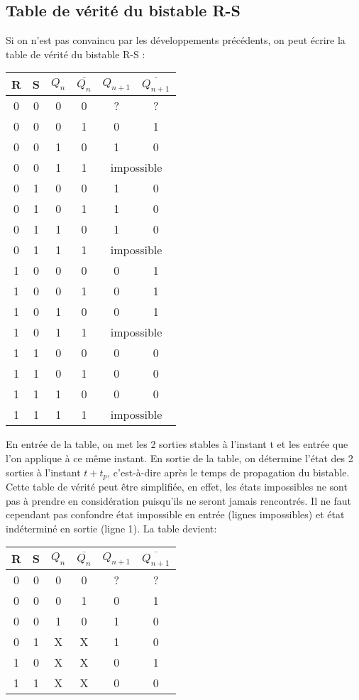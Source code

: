\documentclass[11pt,a4paper]{article}
\theoremstyle{definition}%
\begin{document}
\subsection{Table de vérité du bistable R-S}
Si on n'est pas convaincu par les développements précédents, on peut écrire la table de vérité du
bistable R-S :

\begin{center}
\begin{tabular}{cccc|cc}
R & S & $Q_n$ & $\overline{Q_n}$ & $Q_{n+1}$ & $\overline{Q_{n+1}}$ \\
\hline
0 & 0 & 0 & 0 & ? & ? \\
0 & 0 & 0 & 1 & 0 & 1 \\
0 & 0 & 1 & 0 & 1 & 0 \\
0 & 0 & 1 & 1 &  \multicolumn{2}{c}{impossible} \\
0 & 1 & 0 & 0 & 1 & 0 \\
0 & 1 & 0 & 1 & 1 & 0 \\
0 & 1 & 1 & 0 & 1 & 0 \\
0 & 1 & 1 & 1 & \multicolumn{2}{c}{impossible}  \\
1 & 0 & 0 & 0 & 0 & 1 \\
1 & 0 & 0 & 1 & 0 & 1 \\
1 & 0 & 1 & 0 & 0 & 1 \\
1 & 0 & 1 & 1 & \multicolumn{2}{c}{impossible}  \\
1 & 1 & 0 & 0 & 0 & 0 \\
1 & 1 & 0 & 1 & 0 & 0 \\
1 & 1 & 1 & 0 & 0 & 0 \\
1 & 1 & 1 & 1 & \multicolumn{2}{c}{impossible}  \\
\end{tabular}
\end{center}

En entrée de la table, on met les 2 sorties stables à l'instant t et les entrée que l'on applique à ce
même instant. En sortie de la table, on détermine l'état des 2 sorties à l'instant $t+t_p$, c'est-à-dire après le
temps de propagation du bistable.
Cette table de vérité peut être simplifiée, en effet, les états impossibles ne sont pas à prendre en
considération puisqu'ils ne seront jamais rencontrés. Il ne faut cependant pas confondre état
impossible en entrée (lignes impossibles) et état indéterminé en sortie (ligne 1). La table devient:


\begin{center}
\begin{tabular}{cccc|cc}
R & S & $Q_n$ & $\overline{Q_n}$ & $Q_{n+1}$ & $\overline{Q_{n+1}}$ \\
\hline
0 & 0 & 0 & 0 & ? & ? \\
0 & 0 & 0 & 1 & 0 & 1 \\
0 & 0 & 1 & 0 & 1 & 0 \\
0 & 1 & X & X & 1 & 0 \\
1 & 0 & X & X & 0 & 1 \\
1 & 1 & X & X & 0 & 0 \\
\end{tabular}
\end{center}
\end{document}
